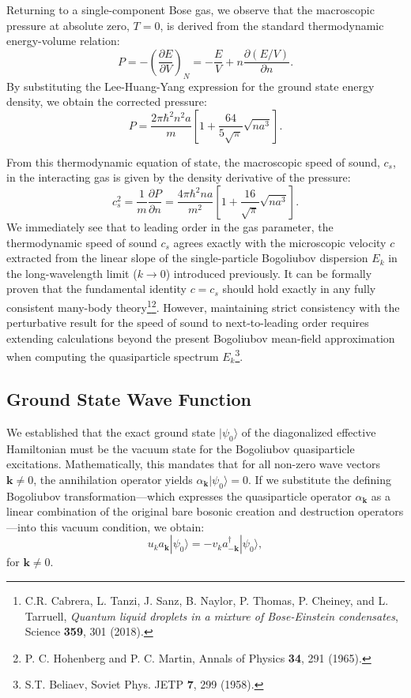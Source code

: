 Returning to a single-component Bose gas, we observe that the macroscopic pressure at absolute zero, \( T = 0 \), is derived from the standard thermodynamic energy-volume relation:
\[
    P = -\left( \frac{\partial E}{\partial V} \right)_N = -\frac{E}{V} + n\frac{\partial (E/V)}{\partial n}.
\]
By substituting the Lee-Huang-Yang expression for the ground state energy density, we obtain the corrected pressure:
\[
    P = \frac{2\pi\hbar^2 n^2 a}{m} \left[ 1 + \frac{64}{5\sqrt{\pi}} \sqrt{na^3} \right].
\]

From this thermodynamic equation of state, the macroscopic speed of sound, \( c_s \), in the interacting gas is given by the density derivative of the pressure:
\[
    c_s^2 = \frac{1}{m} \frac{\partial P}{\partial n} = \frac{4\pi\hbar^2 na}{m^2} \left[ 1 + \frac{16}{\sqrt{\pi}} \sqrt{na^3} \right].
\]
We immediately see that to leading order in the gas parameter, the thermodynamic speed of sound \( c_s \) agrees exactly with the microscopic velocity \( c \) extracted from the linear slope of the single-particle Bogoliubov dispersion \( E_k \) in the long-wavelength limit (\( k \to 0 \)) introduced previously. It can be formally proven that the fundamental identity \( c = c_s \) should hold exactly in any fully consistent many-body theory\footnote{C.R. Cabrera, L. Tanzi, J. Sanz, B. Naylor, P. Thomas, P. Cheiney, and L. Tarruell, \textit{Quantum liquid droplets in a mixture of Bose-Einstein condensates}, Science \textbf{359}, 301 (2018).}\footnote{P. C. Hohenberg and P. C. Martin, Annals of Physics \textbf{34}, 291 (1965).}. However, maintaining strict consistency with the perturbative result for the speed of sound to next-to-leading order requires extending calculations beyond the present Bogoliubov mean-field approximation when computing the quasiparticle spectrum \( E_k \)\footnote{S.T. Beliaev, Soviet Phys. JETP \textbf{7}, 299 (1958).}.

\subsection{Ground State Wave Function}

We established that the exact ground state \( |\psi_0\rangle \) of the diagonalized effective Hamiltonian must be the vacuum state for the Bogoliubov quasiparticle excitations. Mathematically, this mandates that for all non-zero wave vectors \( \mathbf{k} \neq 0 \), the annihilation operator yields \( \alpha_{\mathbf{k}} |\psi_0\rangle = 0 \). If we substitute the defining Bogoliubov transformation—which expresses the quasiparticle operator \( \alpha_{\mathbf{k}} \) as a linear combination of the original bare bosonic creation and destruction operators—into this vacuum condition, we obtain:
\begin{equation} \label{eq:bogoliubov_vacuum_condition}
    u_k a_{\mathbf{k}} |\psi_0\rangle = -v_k a_{-\mathbf{k}}^\dagger |\psi_0\rangle,
\end{equation}
for \( \mathbf{k} \neq 0 \).


